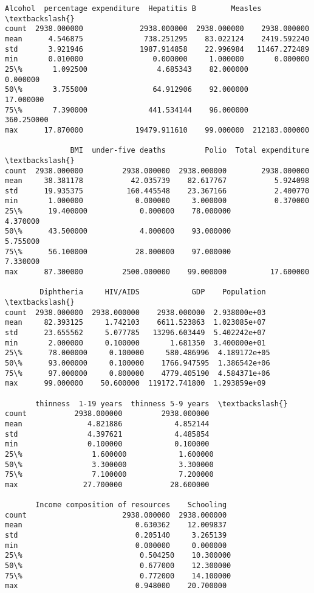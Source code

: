 \documentclass[11pt]{article}
\begin{document}
\begin{Verbatim}[commandchars=\\\{\}]
           Alcohol  percentage expenditure  Hepatitis B        Measles  \textbackslash{}
count  2938.000000             2938.000000  2938.000000    2938.000000
mean      4.546875              738.251295    83.022124    2419.592240
std       3.921946             1987.914858    22.996984   11467.272489
min       0.010000                0.000000     1.000000       0.000000
25\%       1.092500                4.685343    82.000000       0.000000
50\%       3.755000               64.912906    92.000000      17.000000
75\%       7.390000              441.534144    96.000000     360.250000
max      17.870000            19479.911610    99.000000  212183.000000

               BMI  under-five deaths         Polio  Total expenditure  \textbackslash{}
count  2938.000000         2938.000000  2938.000000        2938.000000
mean     38.381178           42.035739    82.617767           5.924098
std      19.935375          160.445548    23.367166           2.400770
min       1.000000            0.000000     3.000000           0.370000
25\%      19.400000            0.000000    78.000000           4.370000
50\%      43.500000            4.000000    93.000000           5.755000
75\%      56.100000           28.000000    97.000000           7.330000
max      87.300000         2500.000000    99.000000          17.600000

        Diphtheria     HIV/AIDS            GDP    Population  \textbackslash{}
count  2938.000000  2938.000000    2938.000000  2.938000e+03
mean     82.393125     1.742103    6611.523863  1.023085e+07
std      23.655562     5.077785   13296.603449  5.402242e+07
min       2.000000     0.100000       1.681350  3.400000e+01
25\%      78.000000     0.100000     580.486996  4.189172e+05
50\%      93.000000     0.100000    1766.947595  1.386542e+06
75\%      97.000000     0.800000    4779.405190  4.584371e+06
max      99.000000    50.600000  119172.741800  1.293859e+09

       thinness  1-19 years  thinness 5-9 years  \textbackslash{}
count           2938.000000         2938.000000
mean               4.821886            4.852144
std                4.397621            4.485854
min                0.100000            0.100000
25\%                1.600000            1.600000
50\%                3.300000            3.300000
75\%                7.100000            7.200000
max               27.700000           28.600000

       Income composition of resources    Schooling
count                      2938.000000  2938.000000
mean                          0.630362    12.009837
std                           0.205140     3.265139
min                           0.000000     0.000000
25\%                           0.504250    10.300000
50\%                           0.677000    12.300000
75\%                           0.772000    14.100000
max                           0.948000    20.700000
    \end{Verbatim}
\end{document}
